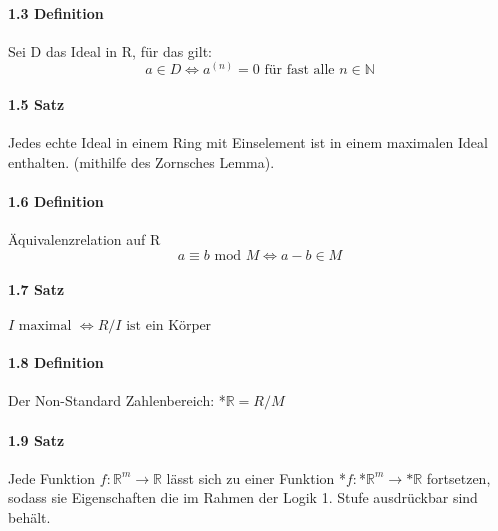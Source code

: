 \documentclass[a4paper]{article}
\begin{document}
\paragraph{1.3 Definition} Sei D das Ideal in R, für das gilt:  
      $$ a \in D \iff a^{(n)} = 0 \text{ für fast alle } n \in \mathbb{N}  $$


\paragraph{1.5 Satz} Jedes echte Ideal in einem Ring mit Einselement ist in einem maximalen Ideal enthalten. (mithilfe des Zornsches Lemma).


\paragraph{1.6 Definition} Äquivalenzrelation auf R  %
$$ a \equiv b \text{ mod } M \iff a - b \in M $$

\paragraph{1.7 Satz} $ I \text{ maximal } \iff R/I  \text{ ist ein Körper} $

\paragraph{1.8 Definition}  Der Non-Standard Zahlenbereich: *$\mathbb{R} = R/M $

\paragraph{1.9 Satz} 
Jede Funktion $f:\mathbb{R}^m \to \mathbb{R} $ lässt sich zu einer 
Funktion *$f:$*$\mathbb{R}^m \to \text{*}\mathbb{R}$ fortsetzen, sodass sie Eigenschaften die im Rahmen 
der Logik 1. Stufe ausdrückbar sind behält.
\end{document}

